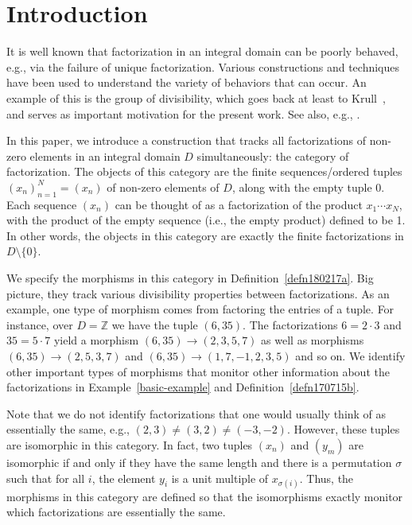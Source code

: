 \documentclass[reqno]{amsart}
\theoremstyle{plain}
\theoremstyle{definition}
\newcommand{\bbz}{\mathbb{Z}}
\newcommand{\emptytuple}{\mathfrak{0}}
\numberwithin{equation}{lem}
\begin{document}
\maketitle

\tableofcontents



\section{Introduction}\label{sec-intro}

It is well known that factorization in an integral domain can be poorly behaved, e.g., via the 
failure of unique factorization.
Various constructions and techniques have been used to understand the variety of behaviors that can occur. 
An example of this is the group of divisibility, which goes back at least to Krull~\cite{krull:ab},
and serves as important motivation for the present work.
See also, e.g., \cite{G3,jaffard,lorenzen,mockor,ohm,rump}.

In this paper, we introduce a construction that tracks all factorizations 
of non-zero elements
in an integral domain $D$ 
simultaneously:
the category of factorization. 
The objects of this category are the finite sequences/ordered tuples $(x_n)_{n=1}^N=(x_n)$ of non-zero elements of $D$,
along with the empty tuple $\emptytuple$. 
Each sequence $(x_n)$ can be thought of as a factorization of the product $x_1\cdots x_N$,
with the product of the empty sequence (i.e., the empty product) defined to be 1. 
In 
other words, the objects in this category are exactly the finite 
factorizations in
$D\setminus\{0\}$.

We specify the morphisms in this category in Definition~\ref{defn180217a}.
Big picture, they track various divisibility properties between factorizations. 
As an example, one type of morphism comes from  factoring the entries of a tuple. 
For instance, over $D=\bbz$ we have the tuple $(6,35)$. The factorizations $6=2\cdot 3$ and $35=5\cdot 7$
yield a morphism $(6,35)\to(2,3,5,7)$ as well as morphisms $(6,35)\to(2,5,3,7)$ and $(6,35)\to(1,7,-1,2,3,5)$ and so on. 
We identify other important types of morphisms that monitor other information about the factorizations
in Example~\ref{basic-example} and Definition~\ref{defn170715b}.

Note that we do not identify factorizations that one would usually think of as essentially the same, e.g., 
$(2,3)\neq(3,2)\neq(-3,-2)$. However, these tuples are 
isomorphic
in this category.
In fact, two tuples $(x_n)$ and $(y_m)$ are isomorphic if and only if they have the same length and there is a permutation
$\sigma$ such that 
for all $i$, 
the element $y_i$ is a unit multiple of
$x_{\sigma(i)}$.
Thus, the morphisms in this category are defined so
that the isomorphisms exactly monitor  which factorizations  are essentially the same.
\end{document}
